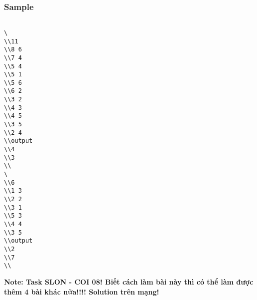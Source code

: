 \subsubsection{   Sample  }
\begin{verbatim}

\ 
\\11 
\\8 6 
\\7 4 
\\5 4 
\\5 1 
\\5 6 
\\6 2 
\\3 2 
\\4 3 
\\4 5 
\\3 5 
\\2 4 
\\output 
\\4 
\\3 
\\
\ 
\\6 
\\1 3 
\\2 2 
\\3 1 
\\5 3 
\\4 4 
\\3 5 
\\output 
\\2 
\\7 
\\\end{verbatim}

\textbf{    Note: Task SLON - COI 08! Biết cách làm bài này thì có thể làm được thêm 4 bài khác nữa!!!! Solution trên mạng!   }